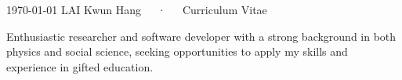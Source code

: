 \documentclass[11pt, a4paper]{awesome-cv}
\begin{document}
\makecvheader

\makecvfooter
  {\today}
  {LAI Kwun Hang~~~·~~~Curriculum Vitae}
  {\thepage}

\vspace{1em}
Enthusiastic researcher and software developer with a strong background in both physics and social science, seeking opportunities to apply my skills and experience in gifted education.







%

%
%
%
%


\end{document}
